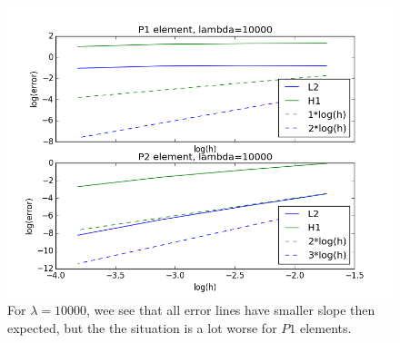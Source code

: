 \documentclass[11pt,a4paper]{report}
\begin{document}
\begin{figure}
  \includegraphics[width=\linewidth]{l10000.png}
  \caption{For $\lambda =10000$, wee see that all error lines have smaller slope then expected, but the the situation is a lot worse for $P1$ elements.}
  \label{Fig 5}
\end{figure}
\end{document}
